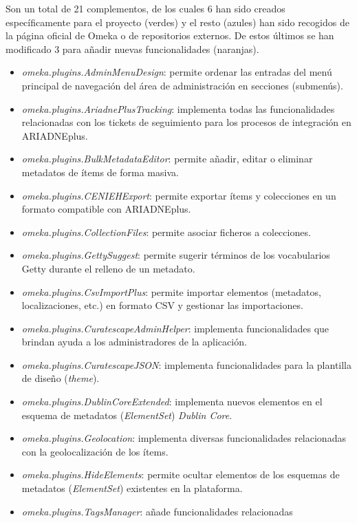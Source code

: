 \documentclass[
]{article}
\providecommand{\tightlist}{%
  \setlength{\itemsep}{0pt}\setlength{\parskip}{0pt}}
\begin{document}
Son un total de 21 complementos, de los cuales 6 han sido creados
específicamente para el proyecto (verdes) y el resto (azules) han sido
recogidos de la página oficial de Omeka o de repositorios externos. De
estos últimos se han modificado 3 para añadir nuevas funcionalidades
(naranjas).

\begin{itemize}
\tightlist
\item
  \emph{omeka.plugins.AdminMenuDesign}: permite ordenar las entradas del
  menú principal de navegación del área de administración en secciones
  (submenús).
\item
  \emph{omeka.plugins.AriadnePlusTracking}: implementa todas las
  funcionalidades relacionadas con los tickets de seguimiento para los
  procesos de integración en ARIADNEplus.
\item
  \emph{omeka.plugins.BulkMetadataEditor}: permite añadir, editar o
  eliminar metadatos de ítems de forma masiva.
\item
  \emph{omeka.plugins.CENIEHExport}: permite exportar ítems y
  colecciones en un formato compatible con ARIADNEplus.
\item
  \emph{omeka.plugins.CollectionFiles}: permite asociar ficheros a
  colecciones.
\item
  \emph{omeka.plugins.GettySuggest}: permite sugerir términos de los
  vocabularios Getty durante el relleno de un metadato.
\item
  \emph{omeka.plugins.CsvImportPlus}: permite importar elementos
  (metadatos, localizaciones, etc.) en formato CSV y gestionar las
  importaciones.
\item
  \emph{omeka.plugins.CuratescapeAdminHelper}: implementa
  funcionalidades que brindan ayuda a los administradores de la
  aplicación.
\item
  \emph{omeka.plugins.CuratescapeJSON}: implementa funcionalidades para
  la plantilla de diseño (\emph{theme}).
\item
  \emph{omeka.plugins.DublinCoreExtended}: implementa nuevos elementos
  en el esquema de metadatos (\emph{ElementSet}) \emph{Dublin Core}.
\item
  \emph{omeka.plugins.Geolocation}: implementa diversas funcionalidades
  relacionadas con la geolocalización de los ítems.
\item
  \emph{omeka.plugins.HideElements}: permite ocultar elementos de los
  esquemas de metadatos (\emph{ElementSet}) existentes en la plataforma.
\item
  \emph{omeka.plugins.TagsManager}: añade funcionalidades relacionadas

\end{itemize}
\end{document}
